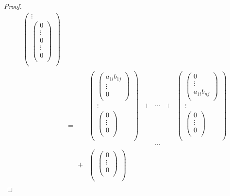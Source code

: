 \documentclass[dvipdfmx]{jsarticle}
\begin{document}
\begin{proof}
\begin{align*}
{\begin{pmatrix}
 \vdots \\
\begin{pmatrix}
0 \\
 \vdots \\
0 \\
 \vdots \\
0 \\
\end{pmatrix} \\
\end{pmatrix}}\\
&= \begin{matrix}
\  & \begin{pmatrix}
\begin{pmatrix}
a_{1i}b_{1j} \\
 \vdots \\
0 \\
\end{pmatrix} \\
 \vdots \\
\begin{pmatrix}
0 \\
 \vdots \\
0 \\
\end{pmatrix} \\
\end{pmatrix} & + & \cdots & + & \begin{pmatrix}
\begin{pmatrix}
0 \\
 \vdots \\
a_{1i}b_{nj} \\
\end{pmatrix} \\
 \vdots \\
\begin{pmatrix}
0 \\
 \vdots \\
0 \\
\end{pmatrix} \\
\end{pmatrix} \\
\  & \  & \  & \cdots & \  & \  \\
 + & \begin{pmatrix}
\begin{pmatrix}
0 \\
 \vdots \\
0 \\
\end{pmatrix} \\

\end{pmatrix}
\end{matrix}
\end{align*}
\end{proof}
\end{document}
